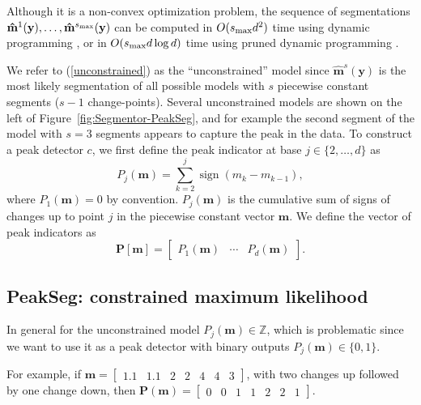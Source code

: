 \documentclass{article}
\DeclareMathOperator*{\sign}{sign}
\newcommand{\ZZ}{\mathbb Z}
\begin{document}
Although it is a non-convex optimization problem, the sequence of
segmentations $\mathbf{\hat m}^1(\mathbf y), \dots, \mathbf{\hat
  m}^{s_{\text{\text{max}}}}(\mathbf y)$ can be computed in
$O(s_{\text{\text{max}}} d^2)$ time using dynamic programming
\citep{bellman}, or in $O(s_{\text{\text{max}}} d \log d)$
time using pruned dynamic programming \citep{pruned-dp, Segmentor}.

We refer to (\ref{unconstrained}) as the ``unconstrained'' model
since $\mathbf{\hat m}^s(\mathbf y)$ is the most likely segmentation
of all possible models with $s$ piecewise constant segments ($s-1$
change-points). Several unconstrained models are shown on the left of
Figure~\ref{fig:Segmentor-PeakSeg}, and for example the second segment
of the model with $s=3$ segments appears to capture the peak in the
data.
To construct a peak detector $c$, we first define the peak indicator at base
$j\in\{2, \dots, d\}$ as
\begin{equation}
  \label{eq:peaks}
  P_j(\mathbf m) = \sum_{k=2}^j \sign( m_{k} - m_{k-1} ),
\end{equation}
where $P_1(\mathbf m)=0$ by convention. $P_j(\mathbf m)$ is the
cumulative sum of signs of changes up to point $j$ in the piecewise
constant vector $\mathbf m$. We define the vector of peak indicators
as
\begin{equation}
  \mathbf
P[\mathbf m] = \left[\begin{array}{ccc} P_1(\mathbf m) & \cdots &
    P_d(\mathbf m)
\end{array}\right].
\end{equation}

\subsection{PeakSeg: constrained maximum likelihood}
\label{sec:constrained}

In general for the unconstrained model $P_j(\mathbf m)\in\ZZ$, which
is problematic since we want to use it as a peak detector with binary
outputs $P_j(\mathbf m)\in \{0, 1\}$. 

For example, if $\mathbf m = \left[\begin{array}{ccccccc}1.1 &
    1.1 & 2 & 2 & 4 & 4 & 3\end{array}\right]$, with two changes up
followed by one change down, then $\mathbf P(\mathbf m) =
\left[\begin{array}{ccccccc}0 & 0 & 1 & 1 & 2 & 2 &
    1 \end{array}\right]$.
\end{document}
